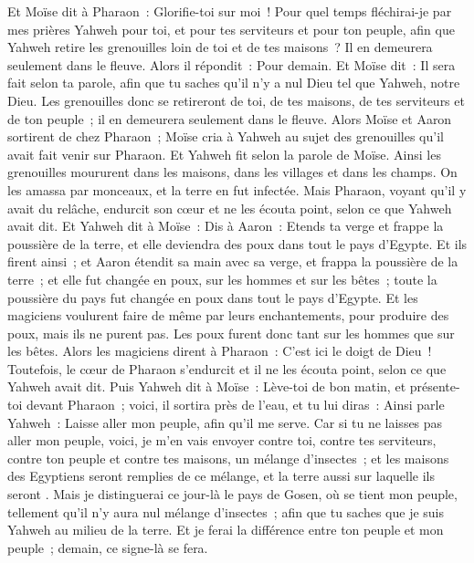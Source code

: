\begin{multicols}{2}
Et Moïse dit à Pharaon~: Glorifie-toi sur moi~! Pour quel temps fléchirai-je par mes prières Yahweh pour toi, et pour tes serviteurs et pour ton peuple, afin que Yahweh retire les grenouilles loin de toi et de tes maisons~? Il en demeurera seulement dans le fleuve.
Alors il répondit~: Pour demain. Et Moïse dit~: Il sera fait selon ta parole, afin que tu saches qu'il n'y a nul Dieu tel que Yahweh, notre Dieu.
Les grenouilles donc se retireront de toi, de tes maisons, de tes serviteurs et de ton peuple~; il en demeurera seulement dans le fleuve.
Alors Moïse et Aaron sortirent de chez Pharaon~; Moïse cria à Yahweh au sujet des grenouilles qu'il avait fait venir sur Pharaon.
Et Yahweh fit selon la parole de Moïse. Ainsi les grenouilles moururent dans les maisons, dans les villages et dans les champs.
On les amassa par monceaux, et la terre en fut infectée.
Mais Pharaon, voyant qu'il y avait du relâche, endurcit son cœur et ne les écouta point, selon ce que Yahweh avait dit.
Et Yahweh dit à Moïse~: Dis à Aaron~: Etends ta verge et frappe la poussière de la terre, et elle deviendra des poux dans tout le pays d'Egypte.
Et ils firent ainsi~; et Aaron étendit sa main avec sa verge, et frappa la poussière de la terre~; et elle fut changée en poux, sur les hommes et sur les bêtes~; toute la poussière du pays fut changée en poux dans tout le pays d'Egypte.
Et les magiciens voulurent faire de même par leurs enchantements, pour produire des poux, mais ils ne purent pas. Les poux furent donc tant sur les hommes que sur les bêtes.
Alors les magiciens dirent à Pharaon~: C'est ici le doigt de Dieu~! Toutefois, le cœur de Pharaon s'endurcit et il ne les écouta point, selon ce que Yahweh avait dit.
Puis Yahweh dit à Moïse~: Lève-toi de bon matin, et présente-toi devant Pharaon~; voici, il sortira près de l'eau, et tu lui diras~: Ainsi parle Yahweh~: Laisse aller mon peuple, afin qu'il me serve.
Car si tu ne laisses pas aller mon peuple, voici, je m'en vais envoyer contre toi, contre tes serviteurs, contre ton peuple et contre tes maisons, un mélange d'insectes~; et les maisons des Egyptiens seront remplies de ce mélange, et la terre aussi sur laquelle ils seront .
Mais je distinguerai ce jour-là le pays de Gosen, où se tient mon peuple, tellement qu'il n'y aura nul mélange d'insectes~; afin que tu saches que je suis Yahweh au milieu de la terre.
Et je ferai la différence entre ton peuple et mon peuple~; demain, ce signe-là se fera.

\end{multicols}
